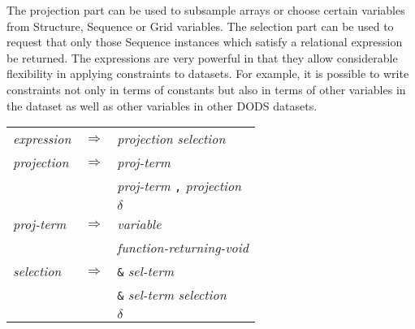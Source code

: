 \documentclass[12pt]{article}
\begin{document}
The projection part can be used to subsample arrays or choose certain
variables from Structure, Sequence or Grid variables. The selection part can
be used to request that only those Sequence instances which satisfy a
relational expression be returned. The expressions are very powerful in that
they allow considerable flexibility in applying constraints to datasets. For
example, it is possible to write constraints not only in terms of constants
but also in terms of other variables in the dataset as well as other
variables in other \ac{DODS} datasets.

\begin{table}
\bigskip
\label{api:tab:expr}
\begin{center}
\begin{tabular}{lll} \hline

\emph{expression} & $\Rightarrow$ & \emph{projection} \emph{selection} \\

\emph{projection} & $\Rightarrow$ & \emph{proj-term} \\
                  &             & \emph{proj-term} {\tt ,} \emph{projection} \\
                  &             & $\delta$ \\

\emph{proj-term}  & $\Rightarrow$ & \emph{variable} \\
                  &             & \emph{function-returning-void}\\

\emph{selection}  & $\Rightarrow$ & {\tt \&} \emph{sel-term} \\
                  &             & {\tt \&} \emph{sel-term} \emph{selection} \\
                  &             & $\delta$ \\


\end{tabular}
\end{center}
\end{table}
\end{document}
